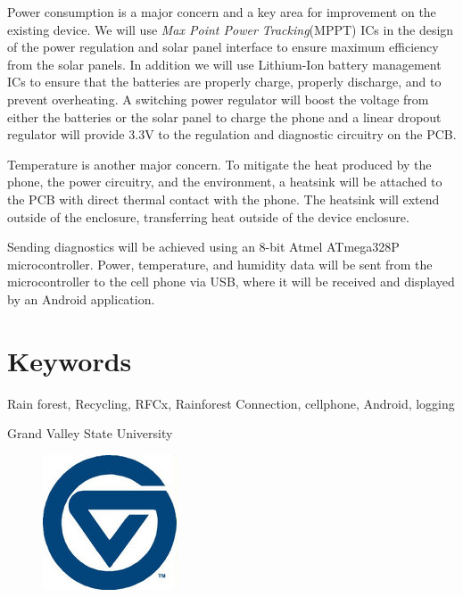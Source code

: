 \documentclass{article}
\newcommand{\Footer}{Grand Valley State University}
\begin{document}
\begin{flushleft}
\bigskip
Power consumption is a major concern and a key area for improvement on the existing device. We will use \textit{Max Point Power Tracking}(MPPT) ICs in the design of the power regulation and solar panel interface to ensure maximum efficiency from the solar panels. In addition we will use Lithium-Ion battery management ICs to ensure that the batteries are properly charge, properly discharge, and to prevent overheating. A switching power regulator will boost the voltage from either the batteries or the solar panel to charge the phone and a linear dropout regulator will provide 3.3V to the regulation and diagnostic circuitry on the PCB. 

\bigskip
Temperature is another major concern. To mitigate the heat produced by the phone, the power circuitry, and the environment, a heatsink will be attached to the PCB with direct thermal contact with the phone. The heatsink will extend outside of the enclosure, transferring heat outside of the device enclosure. 

\bigskip
Sending diagnostics will be achieved using an 8-bit Atmel ATmega328P microcontroller. Power, temperature, and humidity data will be sent from the microcontroller to the cell phone via USB, where it will be received and displayed by an Android application. 


\section*{Keywords}
Rain forest, Recycling, RFCx, Rainforest Connection, cellphone, Android, logging

\vfill

\begin{center}
{\large \Footer}
\end{center}
\begin{figure}[H]
  \centering
  \includegraphics[width=.1\textwidth]{small_gvsu}
\end{figure}
\end{flushleft}
\restoregeometry
\newpage
\end{document}
